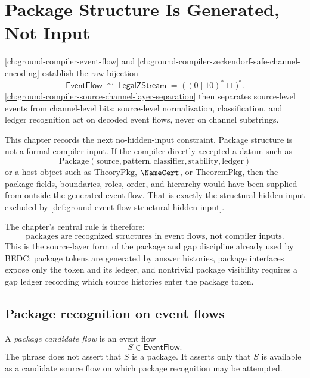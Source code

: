\chapter{Package Structure Is Generated, Not Input}
\label{ch:ground-compiler-package-structure-generated}

\autoref{ch:ground-compiler-event-flow} and \autoref{ch:ground-compiler-zeckendorf-safe-channel-encoding} establish the raw bijection
$$
  \mathsf{EventFlow}
  \;\cong\;
  \mathsf{LegalZStream}
  \;=\;
  \big(\, (0 \mid 10)^{*}\,11 \,\big)^{*}.
$$
\autoref{ch:ground-compiler-source-channel-layer-separation} then separates source-level events from channel-level bits: source-level normalization, classification, and ledger recognition act on decoded event flows, never on channel substrings.

This chapter records the next no-hidden-input constraint. Package structure is not a formal compiler input. If the compiler directly accepted a datum such as
$$
  \mathrm{Package}(\mathrm{source}, \mathrm{pattern}, \mathrm{classifier},
  \mathrm{stability}, \mathrm{ledger})
$$
or a host object such as $\mathrm{TheoryPkg}$, $\NameCert$, or $\mathrm{TheoremPkg}$, then the package fields, boundaries, roles, order, and hierarchy would have been supplied from outside the generated event flow. That is exactly the structural hidden input excluded by \autoref{def:ground-event-flow-structural-hidden-input}.

The chapter's central rule is therefore:
$$
  \boxed{\text{packages are recognized structures in event flows, not compiler inputs}.}
$$
This is the source-layer form of the package and gap discipline already used by BEDC: package tokens are generated by answer histories, package interfaces expose only the token and its ledger, and nontrivial package visibility requires a gap ledger recording which source histories enter the package token.

\section{Package recognition on event flows}
\label{sec:package-generated-recognition}

\begin{definition}
\label{def:package-generated-candidate-flow}
A \emph{package candidate flow} is an event flow
$$
  S \in \mathsf{EventFlow}.
$$
The phrase does not assert that $S$ is a package. It asserts only that $S$ is available as a candidate source flow on which package recognition may be attempted.
\end{definition}

